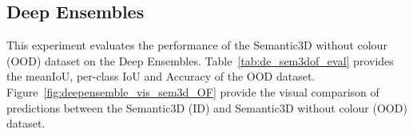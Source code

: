     \subsection{Deep Ensembles}
    This experiment evaluates the performance of the Semantic3D without colour (OOD) dataset on the Deep Ensembles.
    Table~\ref{tab:de_sem3dof_eval} provides the meanIoU, per-class IoU and Accuracy of the OOD dataset.
    Figure~\ref{fig:deepensemble_vis_sem3d_OF} provide the visual comparison of predictions between the Semantic3D (ID) and Semantic3D without colour (OOD) dataset.

